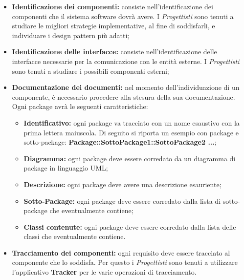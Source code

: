  \begin{itemize}
 	\item \textbf{Identificazione dei componenti: }consiste nell'identificazione dei componenti che il sistema software dovrà avere. I \textit{Progettisti} sono tenuti a studiare le migliori strategie implementative, al fine di soddisfarli, e individuare i \gls{design pattern} più adatti;
 	\item \textbf{Identificazione delle interfacce: }consiste nell'identificazione delle interfacce necessarie per la comunicazione con le entità esterne. I \textit{Progettisti} sono tenuti a studiare i possibili componenti esterni;
 	\item \textbf{Documentazione dei documenti: }nel momento dell'individuazione di un componente, è necessario procedere alla stesura della sua documentazione. Ogni package avrà le seguenti caratteristiche:
	 	\begin{itemize}
	 		\item \textbf{Identificativo: }ogni package va tracciato con un nome esaustivo con la prima lettera maiuscola. Di seguito si riporta un esempio con package e sotto-package:
	 		{\centering \textbf{Package::SottoPackage1::SottoPackage2 ...};}
	 		\item \textbf{Diagramma: }ogni package deve essere corredato da un diagramma di package in linguaggio UML;
	 		\item \textbf{Descrizione: }ogni package deve avere una descrizione esauriente;
	 		\item \textbf{Sotto-Package: }ogni package deve essere corredato dalla lista di sotto-package che eventualmente contiene;
	 		\item \textbf{Classi contenute: }ogni package deve essere corredato dalla lista delle classi che eventualmente contiene.
	 	\end{itemize}
	 \item \textbf{Tracciamento dei componenti: }ogni requisito deve essere tracciato al componente che lo soddisfa. Per questo i \textit{Progettisti} sono tenuti a utilizzare l'applicativo \textbf{Tracker} per le varie operazioni di tracciamento.
 \end{itemize}
 
